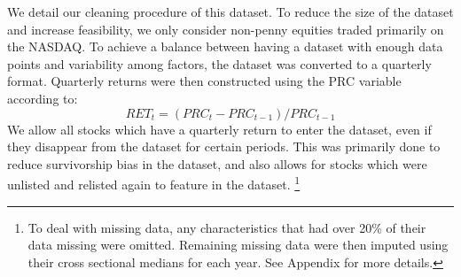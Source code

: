 \documentclass{article}
\begin{document}


We detail our cleaning procedure of this dataset. To reduce the size of the dataset and increase feasibility, we only consider non-penny equities traded primarily on the NASDAQ. To achieve a balance between having a dataset with enough data points and variability among factors, the dataset was converted to a quarterly format. Quarterly returns were then constructed using the PRC variable according to:
\begin{equation}
RET_t = (PRC_t - PRC_{t-1})/PRC_{t-1}
\end{equation}
We allow all stocks which have a quarterly return to enter the dataset, even if they disappear from the dataset for certain periods. This was primarily done to reduce survivorship bias in the dataset, and also allows for stocks which were unlisted and relisted again to feature in the dataset. \footnote{To deal with missing data, any characteristics that had over 20\% of their data missing were omitted. Remaining missing data were then imputed using their cross sectional medians for each year. See Appendix for more details.}



\end{document}
